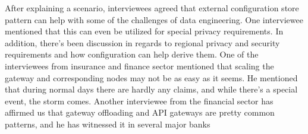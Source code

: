 \documentclass[a4paper,11pt,article,oneside]{memoir}
\begin{document}
After explaining a scenario, interviewees agreed that external configuration store pattern can help with some of the challenges of data engineering. One interviewee mentioned that this can even be utilized for special privacy requirements. In addition, there's been discussion in regards to regional privacy and security requirements and how configuration can help derive them. One of the interviewees from insurance and finance sector mentioned that scaling the gateway and corresponding nodes may not be as easy as it seems. He mentioned that during normal days there are hardly any claims, and while there's a special event, the storm comes.  Another interviewee from the financial sector has affirmed us that gateway offloading and API gateways are pretty common patterns, and he has witnessed it in several major banks








\end{document}
